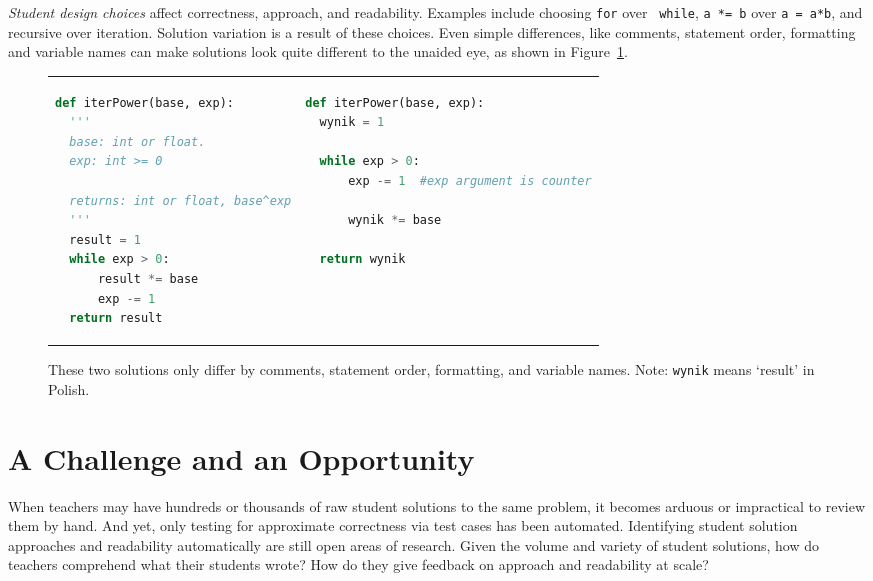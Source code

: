 {\it Student design choices} affect correctness, approach, and readability. Examples include choosing \texttt{for} over ~\texttt{while}, \texttt{a *= b} over \texttt{a = a*b}, and recursive over iteration. Solution variation is a result of these choices. Even simple differences, like comments, statement order, formatting and variable names can make solutions look quite different to the unaided eye, as shown in Figure~\ref{table:difflook}.

\begin{figure}
\begin{tabular}{ll}
\begin{minipage}{0.5\linewidth}
\begin{lstlisting}[basicstyle=\linespread{1.0}\ttfamily\footnotesize,language=python]
def iterPower(base, exp):
  '''
  base: int or float.
  exp: int >= 0

  returns: int or float, base^exp
  '''
  result = 1
  while exp > 0:
      result *= base
      exp -= 1
  return result
\end{lstlisting}
\end{minipage}
& 

\begin{minipage}{1.0\linewidth}
\begin{lstlisting}[basicstyle=\linespread{1.0}\ttfamily\footnotesize,language=python]
def iterPower(base, exp):
  wynik = 1

  while exp > 0:
      exp -= 1  #exp argument is counter

      wynik *= base

  return wynik
\end{lstlisting}
\end{minipage} 
\end{tabular}
\caption{These two solutions only differ by comments, statement order, formatting, and variable names. Note: \texttt{wynik} means `result' in Polish.}
\label{table:difflook}
\end{figure}

\section{A Challenge and an Opportunity}

When teachers may have hundreds or thousands of raw student solutions to the same problem, it becomes arduous or impractical to review them by hand. And yet, only testing for approximate correctness via test cases has been automated. Identifying student solution approaches and readability automatically are still open areas of research. Given the volume and variety of student solutions, how do teachers comprehend what their students wrote? How do they give feedback on approach and readability at scale? 

